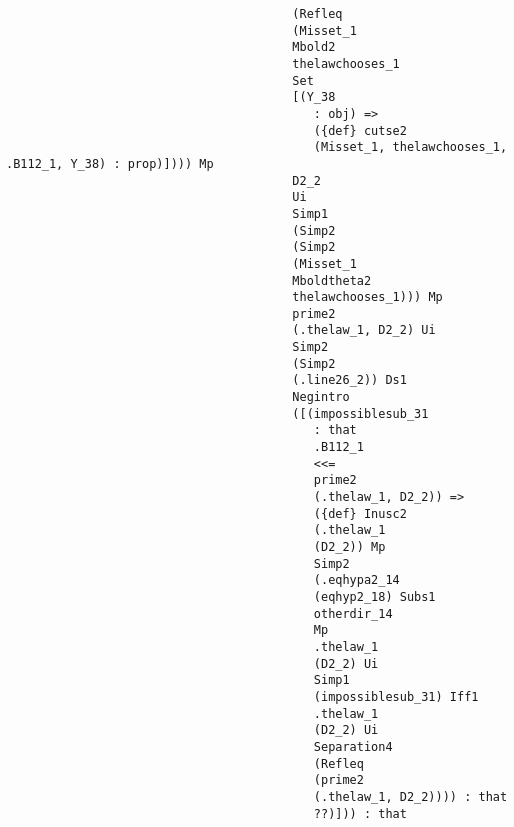 \documentclass[12pt]{article}
\begin{document}
\begin{verbatim}
                                        (Refleq 
                                        (Misset_1 
                                        Mbold2 
                                        thelawchooses_1 
                                        Set 
                                        [(Y_38 
                                           : obj) => 
                                           ({def} cutse2 
                                           (Misset_1, thelawchooses_1, .B112_1, Y_38) : prop)]))) Mp 
                                        D2_2 
                                        Ui 
                                        Simp1 
                                        (Simp2 
                                        (Simp2 
                                        (Misset_1 
                                        Mboldtheta2 
                                        thelawchooses_1))) Mp 
                                        prime2 
                                        (.thelaw_1, D2_2) Ui 
                                        Simp2 
                                        (Simp2 
                                        (.line26_2)) Ds1 
                                        Negintro 
                                        ([(impossiblesub_31 
                                           : that 
                                           .B112_1 
                                           <<= 
                                           prime2 
                                           (.thelaw_1, D2_2)) => 
                                           ({def} Inusc2 
                                           (.thelaw_1 
                                           (D2_2)) Mp 
                                           Simp2 
                                           (.eqhypa2_14 
                                           (eqhyp2_18) Subs1 
                                           otherdir_14 
                                           Mp 
                                           .thelaw_1 
                                           (D2_2) Ui 
                                           Simp1 
                                           (impossiblesub_31) Iff1 
                                           .thelaw_1 
                                           (D2_2) Ui 
                                           Separation4 
                                           (Refleq 
                                           (prime2 
                                           (.thelaw_1, D2_2)))) : that 
                                           ??)])) : that 

\end{verbatim}
\end{document}

